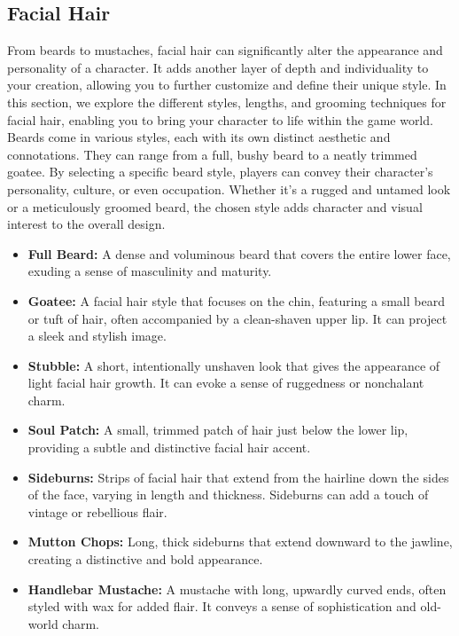 \subsection{\textbf{Facial Hair}}

From beards to mustaches, facial hair can significantly alter the appearance and personality of a character. It adds another layer of depth and individuality to your creation, allowing you to further customize and define their unique style. In this section, we explore the different styles, lengths, and grooming techniques for facial hair, enabling you to bring your character to life within the game world. Beards come in various styles, each with its own distinct aesthetic and connotations. They can range from a full, bushy beard to a neatly trimmed goatee. By selecting a specific beard style, players can convey their character's personality, culture, or even occupation. Whether it's a rugged and untamed look or a meticulously groomed beard, the chosen style adds character and visual interest to the overall design.

\begin{itemize}
    \item \textbf{Full Beard:} A dense and voluminous beard that covers the entire lower face, exuding a sense of masculinity and maturity.
    \item \textbf{Goatee:} A facial hair style that focuses on the chin, featuring a small beard or tuft of hair, often accompanied by a clean-shaven upper lip. It can project a sleek and stylish image.
    \item \textbf{Stubble:} A short, intentionally unshaven look that gives the appearance of light facial hair growth. It can evoke a sense of ruggedness or nonchalant charm.
    \item \textbf{Soul Patch:} A small, trimmed patch of hair just below the lower lip, providing a subtle and distinctive facial hair accent.
    \item \textbf{Sideburns:} Strips of facial hair that extend from the hairline down the sides of the face, varying in length and thickness. Sideburns can add a touch of vintage or rebellious flair.
    \item \textbf{Mutton Chops:} Long, thick sideburns that extend downward to the jawline, creating a distinctive and bold appearance.
    \item \textbf{Handlebar Mustache:} A mustache with long, upwardly curved ends, often styled with wax for added flair. It conveys a sense of sophistication and old-world charm.
\end{itemize}

